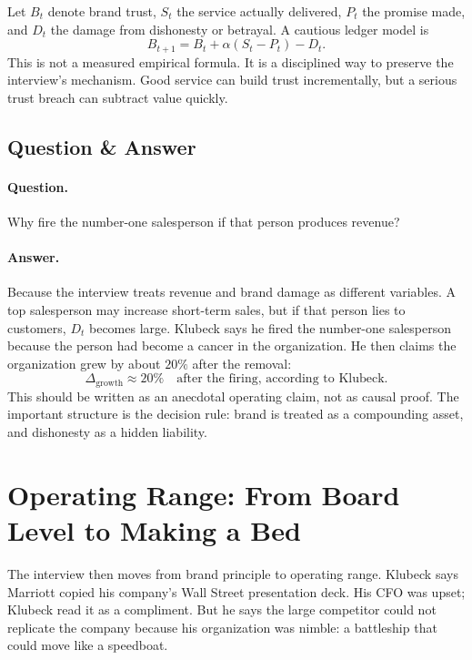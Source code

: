 Let \(B_t\) denote brand trust, \(S_t\) the service actually delivered, \(P_t\) the promise made, and \(D_t\) the damage from dishonesty or betrayal. A cautious ledger model is
\begin{equation}
B_{t+1}=B_t+\alpha(S_t-P_t)-D_t.
\end{equation}
This is not a measured empirical formula. It is a disciplined way to preserve the interview's mechanism. Good service can build trust incrementally, but a serious trust breach can subtract value quickly.

\subsection{Question \& Answer}

\paragraph{Question.}
Why fire the number-one salesperson if that person produces revenue?

\paragraph{Answer.}
Because the interview treats revenue and brand damage as different variables. A top salesperson may increase short-term sales, but if that person lies to customers, \(D_t\) becomes large. Klubeck says he fired the number-one salesperson because the person had become a cancer in the organization. He then claims the organization grew by about \(20\%\) after the removal:
\begin{equation}
\Delta_{\text{growth}}\approx 20\%
\quad
\text{after the firing, according to Klubeck.}
\end{equation}
This should be written as an anecdotal operating claim, not as causal proof. The important structure is the decision rule: brand is treated as a compounding asset, and dishonesty as a hidden liability.

\section{Operating Range: From Board Level to Making a Bed}

The interview then moves from brand principle to operating range. Klubeck says Marriott copied his company's Wall Street presentation deck. His CFO was upset; Klubeck read it as a compliment. But he says the large competitor could not replicate the company because his organization was nimble: a battleship that could move like a speedboat.

